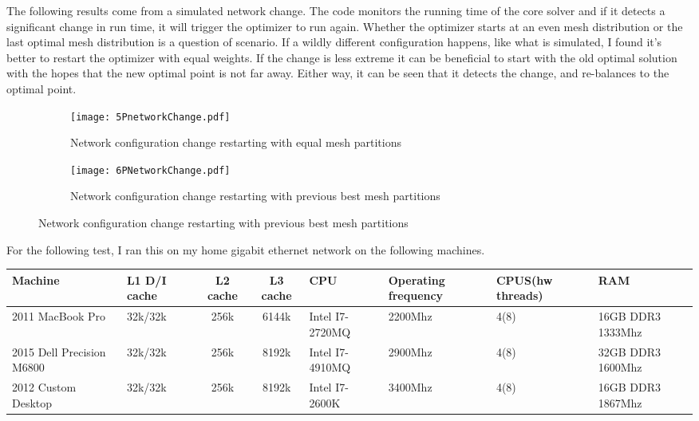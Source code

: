\documentclass[12pt,parskip=full]{article}
\numberwithin{subsection}{section}
\begin{document}
		The following results come from a simulated network change. The code monitors the running time of the core solver and if it detects a significant
		change in run time, it will trigger the optimizer to run again. Whether the optimizer starts at an even mesh distribution or the last optimal mesh
		distribution is a question of scenario. If a wildly different configuration happens, like what is simulated, I found it's better to restart
		the optimizer with equal weights. If the change is less extreme it can be beneficial to start with the old optimal solution with the hopes
		that the new optimal point is not far away. Either way, it can be seen that it detects the change, and re-balances to the optimal point.
		\begin{figure}[H]
			\centering
			\begin{subfigure}[H]{0.9\textwidth}
				\texttt{[image: 5PnetworkChange.pdf]}
				\caption{Network configuration change restarting with equal mesh partitions}
			\end{subfigure}
			\begin{subfigure}[H]{0.9\textwidth}
				\texttt{[image: 6PNetworkChange.pdf]}
				\caption{Network configuration change restarting with previous best mesh partitions}
			\end{subfigure}
		\end{figure}

		For the following test, I ran this on my home gigabit ethernet network on the following machines.

		\begin{centering}
		\begin{tabular}{| m{1.8cm} | m{1.5cm} | c | c | m{1.5cm} | m{2cm} | m{1.8cm} | m{2cm} | }
			\hline
			Machine &	              L1 D/I cache & L2 cache & L3 cache & CPU &	    Operating frequency & CPUS(hw threads) & RAM \\ \hline\hline
			2011 MacBook Pro 	    & 32k/32k      & 256k     & 6144k    & Intel I7-2720MQ & 2200Mhz & 4(8) & 16GB DDR3 1333Mhz \\ \hline
			2015 Dell Precision M6800   & 32k/32k	   & 256k     & 8192k    & Intel I7-4910MQ & 2900Mhz & 4(8) & 32GB DDR3 1600Mhz \\ \hline
			2012 Custom Desktop	    & 32k/32k	   & 256k     & 8192k	 & Intel I7-2600K  & 3400Mhz & 4(8) & 16GB DDR3 1867Mhz \\ \hline
		\end{tabular}
		\end{centering}
\end{document}
